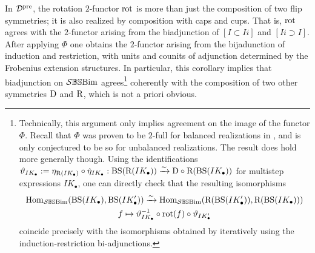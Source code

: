 \begin{remark}\label{rmk rotation and flips and adjunctions}
In $\mathcal{D}^{\operatorname{pre}}$, the rotation $2$-functor $\operatorname{rot}$ is more than just the composition of two flip symmetries; it is also realized by composition with caps and cups. That is, $\operatorname{rot}$ agrees with the $2$-functor arising from the biadjunction of $[I \subset Ii]$ and $[Ii \supset I]$. After applying $\Phi$ one obtains the $2$-functor arising from the bijadunction of induction and restriction, with units and counits of adjunction determined by the Frobenius extension structures. In particular, this corollary implies that biadjunction on $\mathcal{S}\mathbb{BS}\text{Bim}$ agrees\footnote{Technically, this argument only implies agreement on the image of the functor $\Phi$. Recall that $\Phi$ was proven to be $2$-full for balanced realizations in \cite{EKLP}, and is only conjectured to be so for unbalanced realizations. The result does hold more generally though. Using the identifications $\vartheta_{IK_\bullet}:=\eta_{\mathrm{R}(IK_\bullet)} \circ \dot{\eta}_{IK_\bullet}:\operatorname{BS}(\mathrm{R}(IK_\bullet))\xrightarrow{\sim} \mathrm{D} \circ \mathrm{R}(\operatorname{BS}(IK_\bullet))$ 
for multistep expressions $IK_\bullet$, one can directly check that the resulting isomorphisms 
 \begin{gather*}
 \operatorname{Hom}_{\mathcal{S}\mathbb{BS}\text{Bim}}(\operatorname{BS}(IK_\bullet), \operatorname{BS}(IK'_\bullet)) \xrightarrow{\sim} \operatorname{Hom}_{\mathcal{S}\mathbb{BS}\text{Bim}}(\mathrm{R} (\operatorname{BS}(IK'_\bullet)), \mathrm{R}(\operatorname{BS}(IK_\bullet)))\\
 f \mapsto \vartheta_{IK_\bullet}^{-1}\circ \operatorname{rot}(f) \circ \vartheta_{IK'_\bullet}
 \end{gather*}
  coincide precisely with the isomorphisms obtained by iteratively using the induction-restriction bi-adjunctions.} coherently with the composition of two other symmetries $\mathrm{D}$ and $\mathrm{R}$, which is not a priori obvious. 
\end{remark}



